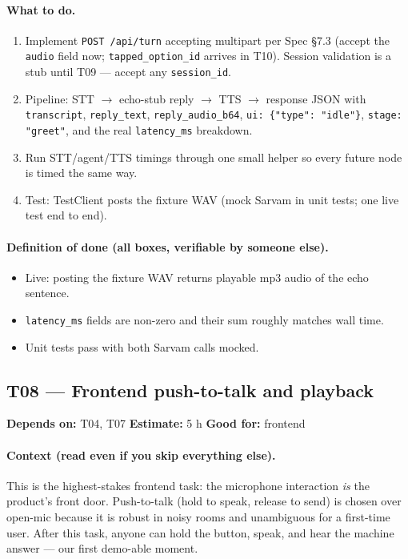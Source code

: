 \documentclass[11pt]{article}
\newcommand{\code}[1]{\texttt{#1}}
\newcommand{\taskmeta}[3]{\noindent\textbf{Depends on:} #1 \quad\textbullet\quad \textbf{Estimate:} #2 \quad\textbullet\quad \textbf{Good for:} #3\par\vspace{2pt}}
\newcommand{\ctx}[1]{\paragraph{Context (read even if you skip everything else).} #1}
\newcommand{\dod}{\paragraph{Definition of done (all boxes, verifiable by someone else).}}
\begin{document}
\paragraph{What to do.}
\begin{enumerate}
  \item Implement \code{POST /api/turn} accepting multipart per Spec \S7.3 (accept the \code{audio} field now; \code{tapped\_option\_id} arrives in T10). Session validation is a stub until T09 --- accept any \code{session\_id}.
  \item Pipeline: STT \(\rightarrow\) echo-stub reply \(\rightarrow\) TTS \(\rightarrow\) response JSON with \code{transcript}, \code{reply\_text}, \code{reply\_audio\_b64}, \code{ui: \{"type": "idle"\}}, \code{stage: "greet"}, and the real \code{latency\_ms} breakdown.
  \item Run STT/agent/TTS timings through one small helper so every future node is timed the same way.
  \item Test: TestClient posts the fixture WAV (mock Sarvam in unit tests; one live test end to end).
\end{enumerate}
\dod
\begin{itemize}
  \item Live: posting the fixture WAV returns playable mp3 audio of the echo sentence.
  \item \code{latency\_ms} fields are non-zero and their sum roughly matches wall time.
  \item Unit tests pass with both Sarvam calls mocked.
\end{itemize}

\subsection{T08 --- Frontend push-to-talk and playback}
\taskmeta{T04, T07}{5 h}{frontend}
\ctx{This is the highest-stakes frontend task: the microphone interaction \emph{is} the product's front door. Push-to-talk (hold to speak, release to send) is chosen over open-mic because it is robust in noisy rooms and unambiguous for a first-time user. After this task, anyone can hold the button, speak, and hear the machine answer --- our first demo-able moment.}
\end{document}
